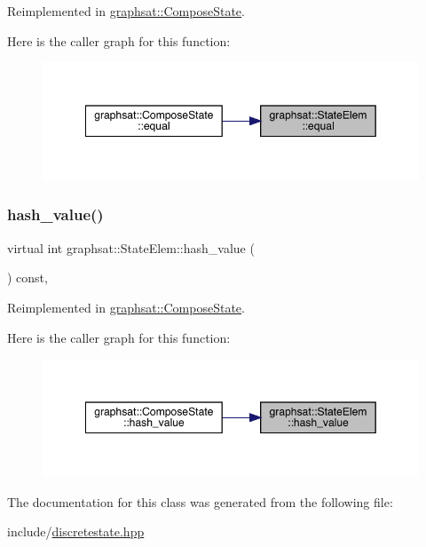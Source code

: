 Reimplemented in \mbox{\hyperlink{classgraphsat_1_1_compose_state_a0163df015711607299462617d7132d2d}{graphsat\+::\+Compose\+State}}.

Here is the caller graph for this function\+:\nopagebreak
\begin{figure}[H]
\begin{center}
\leavevmode
\includegraphics[width=349pt]{classgraphsat_1_1_state_elem_a96f98a1a836950bec46b03269defd823_icgraph}
\end{center}
\end{figure}
\mbox{\label{classgraphsat_1_1_state_elem_a62c95e1989edf61e695f17709d84d626}} 
\subsubsection{\texorpdfstring{hash\_value()}{hash\_value()}}
{\footnotesize\ttfamily virtual int graphsat\+::\+State\+Elem\+::hash\+\_\+value (\begin{DoxyParamCaption}{ }\end{DoxyParamCaption}) const\hspace{0.3cm}{\ttfamily [inline]}, {\ttfamily [virtual]}}



Reimplemented in \mbox{\hyperlink{classgraphsat_1_1_compose_state_ae1b74f6f1f3d18694e1a8f1d83bec163}{graphsat\+::\+Compose\+State}}.

Here is the caller graph for this function\+:\nopagebreak
\begin{figure}[H]
\begin{center}
\leavevmode
\includegraphics[width=349pt]{classgraphsat_1_1_state_elem_a62c95e1989edf61e695f17709d84d626_icgraph}
\end{center}
\end{figure}


The documentation for this class was generated from the following file\+:\begin{DoxyCompactItemize}
\item 
include/\mbox{\hyperlink{discretestate_8hpp}{discretestate.\+hpp}}\end{DoxyCompactItemize}
